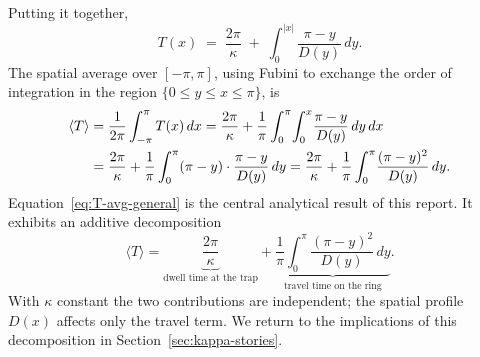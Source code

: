 
Putting it together,
\begin{equation}
{\;
T(x) \;=\; \frac{2\pi}{\kappa} \;+\; \int_0^{|x|}\!\frac{\pi-y}{D(y)}\,dy.
\;}\label{eq:T-final}
\end{equation}
The spatial average over $[-\pi,\pi]$, using Fubini to exchange the order of
integration in the region $\{0\le y\le x\le\pi\}$, is
\begin{align}
\langle T\rangle
&=\frac{1}{2\pi}\int_{-\pi}^\pi T(x)\,dx
=\frac{2\pi}{\kappa}
+\frac{1}{\pi}\int_0^\pi\!\int_0^x\!\frac{\pi-y}{D(y)}\,dy\,dx \notag\\
&=\frac{2\pi}{\kappa}
+\frac{1}{\pi}\int_0^\pi (\pi-y)\cdot\frac{\pi-y}{D(y)}\,dy
=\frac{2\pi}{\kappa}
+\frac{1}{\pi}\int_0^\pi\!\frac{(\pi-y)^2}{D(y)}\,dy.
\label{eq:T-avg-general}
\end{align}
Equation~\eqref{eq:T-avg-general} is the central analytical result of this
report.  It exhibits an additive decomposition
\[
\langle T\rangle
=\underbrace{\frac{2\pi}{\kappa}}_{\text{dwell time at the trap}}
+\underbrace{\frac{1}{\pi}\int_0^\pi\!\frac{(\pi-y)^2}{D(y)}\,dy}_{\text{travel time on the ring}}.
\]
With $\kappa$ constant the two contributions are independent; the spatial
profile $D(x)$ affects only the travel term.  We return to the implications of
this decomposition in Section~\ref{sec:kappa-stories}.
